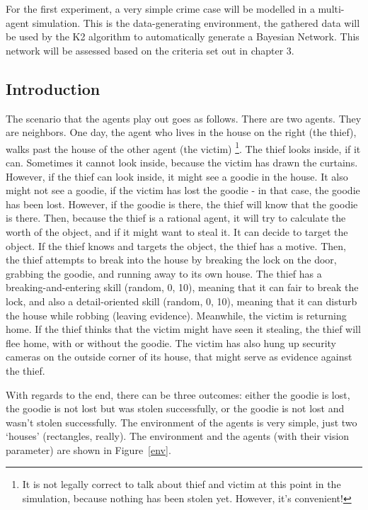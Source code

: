 For the first experiment, a very simple crime case will be modelled in a multi-agent simulation. This is the data-generating environment, the gathered data will be used by the K2 algorithm to automatically generate a Bayesian Network. This network will be assessed based on the criteria set out in chapter 3.  

\subsection{Introduction}

The scenario that the agents play out goes as follows. There are two agents. They are neighbors. One day, the agent who lives in the house on the right (the thief), walks past the house of the other agent (the victim) \footnote{It is not legally correct to talk about thief and victim at this point in the simulation, because nothing has been stolen yet. However, it's convenient!}. The thief looks inside, if it can. Sometimes it cannot look inside, because the victim has drawn the curtains. However, if the thief can look inside, it might see a goodie in the house. It also might not see a goodie, if the victim has lost the goodie - in that case, the goodie has been lost. However, if the goodie is there, the thief will know that the goodie is there. Then, because the thief is a rational agent, it will try to calculate the worth of the object, and if it might want to steal it. It can decide to target the object. If the thief knows and targets the object, the thief has a motive. Then, the thief attempts to break into the house by breaking the lock on the door, grabbing the goodie, and running away to its own house. The thief has a breaking-and-entering skill (random, 0, 10), meaning that it can fair to break the lock, and also a detail-oriented skill (random, 0, 10), meaning that it can disturb the house while robbing (leaving evidence). Meanwhile, the victim is returning home. If the thief thinks that the victim might have seen it stealing, the thief will flee home, with or without the goodie. The victim has also hung up security cameras on the outside corner of its house, that might serve as evidence against the thief.

With regards to the end, there can be three outcomes: either the goodie is lost, the goodie is not lost but was stolen successfully, or the goodie is not lost and wasn't stolen successfully. %
The environment of the agents is very simple, just two `houses' (rectangles, really). The environment and the agents (with their vision parameter) are shown in Figure~\ref{env}.

